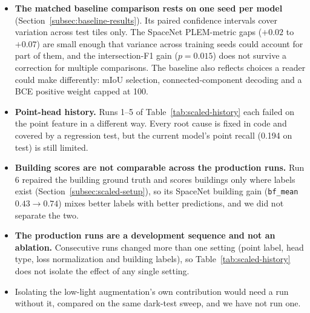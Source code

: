 \begin{itemize}
  \item \textbf{The matched baseline comparison rests on one seed per model}
    (Section~\ref{subsec:baseline-results}). Its paired confidence intervals cover variation across
    test tiles only. The SpaceNet PLEM-metric gaps ($+0.02$ to $+0.07$) are small enough that
    variance across training seeds could account for part of them, and the intersection-F1 gain
    ($p = 0.015$) does not survive a correction for multiple comparisons. The baseline also
    reflects choices a reader could make differently: mIoU selection, connected-component decoding
    and a BCE positive weight capped at 100.
  \item \textbf{Point-head history.} Runs 1--5 of Table~\ref{tab:scaled-history} each failed on
    the point feature in a different way. Every root cause is fixed in code and covered by a
    regression test, but the current model's point recall (0.194 on test) is still limited.
  \item \textbf{Building scores are not comparable across the production runs.} Run 6 repaired the
    building ground truth and scores buildings only where labels exist
    (Section~\ref{subsec:scaled-setup}), so its SpaceNet building gain (\texttt{bf\_mean}
    $0.43 \to 0.74$) mixes better labels with better predictions, and we did not separate the two.
  \item \textbf{The production runs are a development sequence and not an ablation.} Consecutive
    runs changed more than one setting (point label, head type, loss normalization and building
    labels), so Table~\ref{tab:scaled-history} does not isolate the effect of any single setting.
  \item Isolating the low-light augmentation's own contribution would need a run without it,
    compared on the same dark-test sweep, and we have not run one.
\end{itemize}
